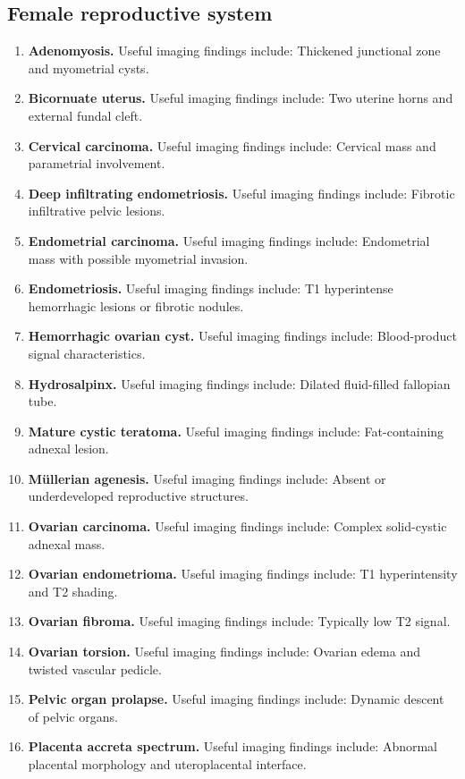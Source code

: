 \subsection{Female reproductive system}
\begin{enumerate}[leftmargin=*,itemsep=0.45em,topsep=0.4em]
\item \textbf{Adenomyosis.} Useful imaging findings include: Thickened junctional zone and myometrial cysts.
\item \textbf{Bicornuate uterus.} Useful imaging findings include: Two uterine horns and external fundal cleft.
\item \textbf{Cervical carcinoma.} Useful imaging findings include: Cervical mass and parametrial involvement.
\item \textbf{Deep infiltrating endometriosis.} Useful imaging findings include: Fibrotic infiltrative pelvic lesions.
\item \textbf{Endometrial carcinoma.} Useful imaging findings include: Endometrial mass with possible myometrial invasion.
\item \textbf{Endometriosis.} Useful imaging findings include: T1 hyperintense hemorrhagic lesions or fibrotic nodules.
\item \textbf{Hemorrhagic ovarian cyst.} Useful imaging findings include: Blood-product signal characteristics.
\item \textbf{Hydrosalpinx.} Useful imaging findings include: Dilated fluid-filled fallopian tube.
\item \textbf{Mature cystic teratoma.} Useful imaging findings include: Fat-containing adnexal lesion.
\item \textbf{Müllerian agenesis.} Useful imaging findings include: Absent or underdeveloped reproductive structures.
\item \textbf{Ovarian carcinoma.} Useful imaging findings include: Complex solid-cystic adnexal mass.
\item \textbf{Ovarian endometrioma.} Useful imaging findings include: T1 hyperintensity and T2 shading.
\item \textbf{Ovarian fibroma.} Useful imaging findings include: Typically low T2 signal.
\item \textbf{Ovarian torsion.} Useful imaging findings include: Ovarian edema and twisted vascular pedicle.
\item \textbf{Pelvic organ prolapse.} Useful imaging findings include: Dynamic descent of pelvic organs.
\item \textbf{Placenta accreta spectrum.} Useful imaging findings include: Abnormal placental morphology and uteroplacental interface.

\end{enumerate}
